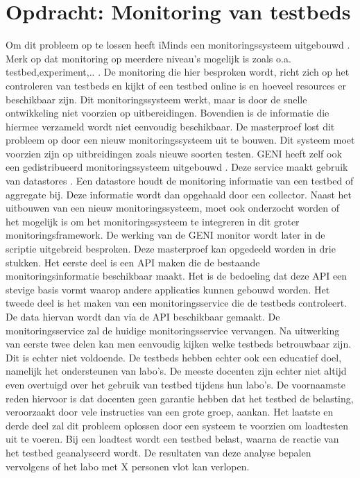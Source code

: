 \section{Opdracht: Monitoring van testbeds}
\npar
Om dit probleem op te lossen heeft iMinds een monitoringssysteem uitgebouwd \citep{fed4fire-second-fed-arch} \citep{Walc1406}. Merk op dat monitoring op meerdere niveau's mogelijk is zoals o.a. testbed,experiment,.. . De monitoring die hier besproken wordt, richt zich op het controleren van testbeds en kijkt of een testbed online is en hoeveel resources er beschikbaar zijn. 
\npar
Dit monitoringssysteem werkt, maar is door de snelle ontwikkeling niet voorzien op uitbereidingen. Bovendien is de informatie die hiermee verzameld wordt niet eenvoudig beschikbaar. De masterproef lost dit probleem op door een nieuw monitoringssysteem uit te bouwen. Dit systeem moet voorzien zijn op uitbreidingen zoals nieuwe soorten testen.
\npar
GENI heeft zelf ook een gedistribueerd monitoringssysteem uitgebouwd \citep{geni-monitor}. Deze service maakt gebruik van datastores \citep{geni-overview}. Een datastore houdt de monitoring informatie van een testbed of aggregate bij. Deze informatie wordt dan opgehaald door een collector. Naast het uitbouwen van een nieuw monitoringssysteem, moet ook onderzocht worden of het mogelijk is om het monitoringssysteem te integreren in dit groter monitoringsframework. De werking van de GENI monitor wordt later in de scriptie uitgebreid besproken.
\npar
Deze masterproef kan opgedeeld worden in drie stukken. Het eerste deel is een API maken die de bestaande monitoringsinformatie beschikbaar maakt. Het is de bedoeling dat deze API een stevige basis vormt waarop andere applicaties kunnen gebouwd worden.
\clearpage
\npar
Het tweede deel is het maken van een monitoringsservice die de testbeds controleert. De data hiervan wordt dan via de API beschikbaar gemaakt. De monitoringsservice zal de huidige monitoringsservice vervangen.
\npar
Na uitwerking van eerste twee delen kan men eenvoudig kijken welke testbeds betrouwbaar zijn. Dit is echter niet voldoende. De testbeds hebben echter ook een educatief doel, namelijk het ondersteunen van labo's. De meeste docenten zijn echter niet altijd even overtuigd over het gebruik van testbed tijdens hun labo's. De voornaamste reden hiervoor is dat docenten geen garantie hebben dat het testbed de belasting, veroorzaakt door vele instructies van een grote groep, aankan. 
\npar
Het laatste en derde deel zal dit probleem oplossen door een systeem te voorzien om loadtesten uit te voeren. Bij een loadtest wordt een testbed belast, waarna de reactie van het testbed geanalyseerd wordt. De resultaten van deze analyse bepalen vervolgens of het labo met X personen vlot kan verlopen.